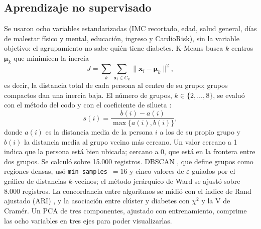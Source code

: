 \documentclass[conference,a4paper]{IEEEtran}
\begin{document}
\subsection{Aprendizaje no supervisado}
Se usaron ocho variables estandarizadas (IMC recortado, edad, salud general, días de malestar físico y mental, educación, ingreso y CardioRisk), sin la variable objetivo: el agrupamiento no sabe quién tiene diabetes. K-Means \citep{macqueen1967} busca $k$ centros $\boldsymbol\mu_k$ que minimicen la inercia
\begin{equation}
J=\sum_k\sum_{\mathbf x_i\in C_k}\lVert\mathbf x_i-\boldsymbol\mu_k\rVert^2 ,
\end{equation}
es decir, la distancia total de cada persona al centro de su grupo; grupos compactos dan una inercia baja. El número de grupos, $k\in\{2,\ldots,8\}$, se evaluó con el método del codo y con el coeficiente de silueta \citep{rousseeuw1987}:
\begin{equation}
s(i)=\frac{b(i)-a(i)}{\max\{a(i),b(i)\}},
\end{equation}
donde $a(i)$ es la distancia media de la persona $i$ a los de su propio grupo y $b(i)$ la distancia media al grupo vecino más cercano. Un valor cercano a 1 indica que la persona está bien ubicada; cercano a 0, que está en la frontera entre dos grupos. Se calculó sobre 15.000 registros. DBSCAN \citep{ester1996}, que define grupos como regiones densas, usó \texttt{min\_samples}~$=16$ y cinco valores de $\varepsilon$ guiados por el gráfico de distancias $k$-vecinos; el método jerárquico de Ward \citep{ward1963} se ajustó sobre 8.000 registros. La concordancia entre algoritmos se midió con el índice de Rand ajustado (ARI) \citep{hubert1985}, y la asociación entre clúster y diabetes con $\chi^2$ y la V de Cramér. Un PCA de tres componentes, ajustado con entrenamiento, comprime las ocho variables en tres ejes para poder visualizarlas.
\end{document}
